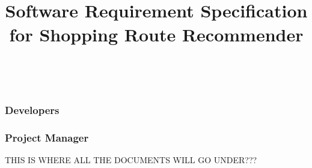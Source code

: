 \documentclass[10pt, a4paper, twocolumn]{scrartcl}
\begin{document}
		\subsubsection{Developers}
		
		\subsubsection{Project Manager}
	
	
\onecolumn 

\title{\normalfont \normalsize
	\horrule{0.5pt} \\ [10pt]
	\huge Software Requirement Specification for Shopping Route Recommender \\
	\horrule{2pt} \\ [10pt]}
\date {}

\maketitle
	
		THIS IS WHERE ALL THE DOCUMENTS WILL GO UNDER???
\end{document}
